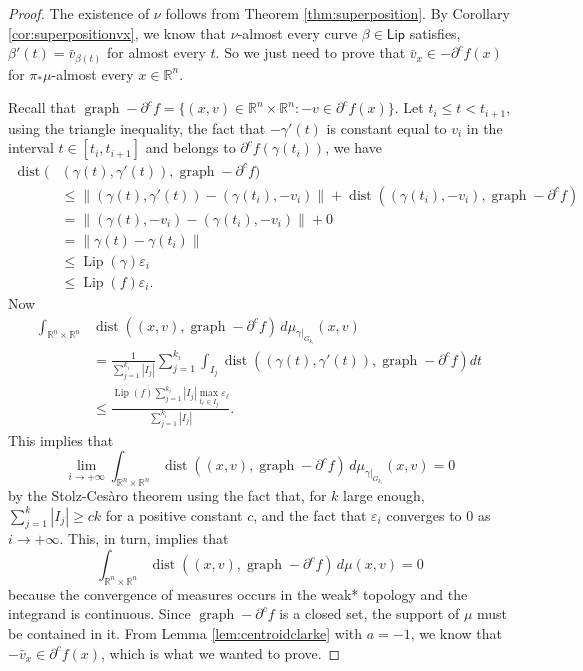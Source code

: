 \documentclass[11pt]{article}
\theoremstyle{definition}
\theoremstyle{remark}
\DeclareMathOperator{\dist}{dist}
\DeclareMathOperator{\lip}{Lip}
\newcommand{\R}{\mathbb{R}}
\newcommand{\lipschitz}{\mathsf{Lip}}
\renewcommand{\geq}{\geqslant}
\renewcommand{\leq}{\leqslant}
\newcommand{\meas}[2]{\mu_{#1|_{#2}}}
\begin{document}
\begin{proof}
 The existence of $\nu$ follows from Theorem \ref{thm:superposition}. By Corollary \ref{cor:superpositionvx}, we know that $\nu$-almost every curve $\beta\in\lipschitz$ satisfies,  $\beta'(t)=\bar v_{\beta(t)}$ for almost every $t$.   So we just need to prove that $\bar v_x\in-\partial^cf(x)$ for $\pi_*\mu$-almost every $x\in\R^n$. 
 
 Recall that $ \operatorname{graph}-\partial^cf=\{(x,v)\in\R^n\times\R^n:-v\in\partial^cf(x)\}.$ 
Let $t_i\leq t<t_{i+1}$, using the triangle inequality, 
%
%
the fact that $-\gamma'(t)$ is constant equal to $v_i$ in the interval $t\in[t_i,t_{i+1}]$ and belongs to $\partial^cf(\gamma(t_i))$, we have 
\begin{align*}
  \dist(&(\gamma(t),\gamma'(t)),\operatorname{graph}-\partial^cf)\\
 &\leq   \|(\gamma(t), \gamma'(t))-(\gamma(t_i), -v_i)\|+\dist((\gamma(t_i),-v_i),\operatorname{graph}-\partial^cf)\\
 &=  \|(\gamma(t),- v_i)-(\gamma(t_i),- v_i)\|+0\\
 &=   \|\gamma(t)-\gamma(t_i)\|\\
 & \leq   \lip(\gamma)\varepsilon_i\\
 &\leq \lip(f)\varepsilon_i.
\end{align*}
Now 
\begin{align*}
 \int_{\R^n\times\R^n}&\dist((x,v),\operatorname{graph}-\partial^cf)\,d\meas{\gamma}{G_{k_i}}(x,v)\\
 &=  \frac{1}{\sum_{j=1}^{k_i} |I_j|}\sum_{j=1}^{k_i} \int_{I_j}\dist\left((\gamma(t), \gamma'(t)),\operatorname{graph}-\partial^cf\right)dt\\
 & \leq   \frac{\lip(f)\sum_{j=1}^{k_i}  |I_j|\max_{t_\ell\in I_j} \varepsilon_\ell }{\sum_{j=1}^{k_i} |I_j|}.
\end{align*}
%
%
 This implies that 
 \[\lim_{i\to+\infty} \int_{\R^n\times\R^n}\dist((x,v),\operatorname{graph}-\partial^cf)\,d\meas{\gamma}{G_{k_i}}(x,v)=0\]
 by the Stolz-Ces\`aro theorem using the fact that, for $k$ large enough, $\sum_{j=1}^{k} |I_j| \geq ck$ for a positive constant $c$, and the fact that $\varepsilon_i$ converges to $0$ as $i \to + \infty$.
%
 This, in turn, implies that
 \[ \int_{\R^n\times\R^n}\dist((x,v),\operatorname{graph}-\partial^cf)\,d\mu(x,v)=0\]
 because the convergence of measures occurs in the weak* topology and the integrand is continuous. %
 Since $\operatorname{graph}-\partial^cf$ is a closed set, the support of $\mu$ must be contained in it. %
 From Lemma \ref{lem:centroidclarke} with $a=-1$, we know that $-\bar v_x\in \partial^cf(x)$, which is what we wanted to prove.
%
%
%
%
%
%
%
%
%
%
%
\end{proof}
\end{document}
